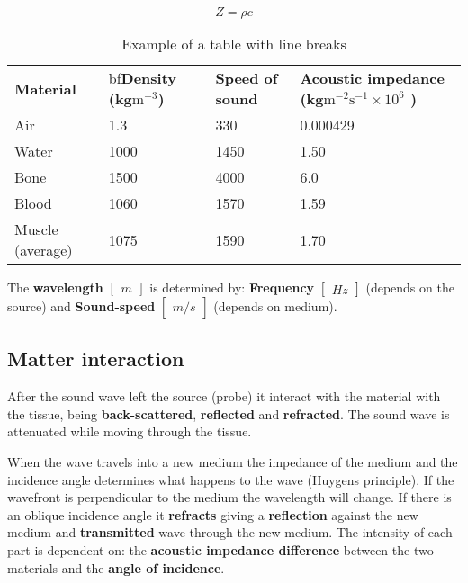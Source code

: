 		\begin{equation}
			Z = \rho c
		\end{equation}

\newpage

		\begin{table}[ht!]
		\centering
		\begin{tabular}{lllm{5cm}}\hline
		\textbf{Material} & bf\textbf{Density (kg$\text{m}^{-3}$)}& \textbf{Speed of sound}& \textbf{Acoustic impedance \newline (kg$\text{m}^{-2}$$\text{s}^{-1} \times 10^6$ )} \\

		Air & 1.3 &  330& 0.000429\\

		Water & 1000 & 1450& 1.50\\

		Bone & 1500 & 4000& 6.0\\
		
		Blood & 1060 & 1570& 1.59\\

		Muscle (average) & 1075 & 1590& 1.70 \\ \hline
		
		\end{tabular}
		\caption{Example of a table with line breaks}
		\label{tab:example}
		\end{table}

	The \textbf{wavelength} $\begin{bmatrix} m \end{bmatrix}$ is determined by: \textbf{Frequency} $\begin{bmatrix} Hz \end{bmatrix}$ (depends on the source) and \textbf{Sound-speed} $\begin{bmatrix} m/s \end{bmatrix}$ (depends on medium). 

	\subsection*{Matter interaction}
	After the sound wave left the source (probe) it interact with the material with the tissue, being \textbf{back-scattered}, \textbf{reflected}  and \textbf{refracted}. The sound wave is attenuated while moving through the tissue. 

	When the wave travels into a new medium the impedance of the medium and the incidence angle determines what happens to the wave (Huygens principle). If the wavefront is perpendicular to the medium the wavelength will change. If there is an oblique incidence angle it \textbf{refracts} giving a \textbf{reflection} against the new medium and \textbf{transmitted} wave through the new medium. The intensity of each part is dependent on: the \textbf{acoustic impedance difference} between the two materials and the \textbf{angle of incidence}.

